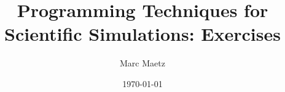 \documentclass[10pt,a5paper,twoside]{memoir}
\title{\Huge Programming Techniques for Scientific Simulations: Exercises
}
\author{\LARGE Marc Maetz}
\date{\vspace{1em}\today}
\begin{document}
 

\begin{titlingpage}
\maketitle
\end{titlingpage}
\nopagebreak[0]







%

















\newpage
\tableofcontents
\printindex[cpp]
\end{document}
